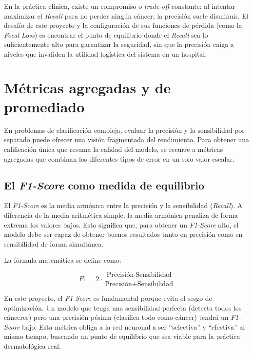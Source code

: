 En la práctica clínica, existe un compromiso o \textit{trade-off} constante: al intentar maximizar el \textit{Recall} para no perder ningún cáncer, la precisión suele disminuir. El desafío de este proyecto y la configuración de sus funciones de pérdida (como la \textit{Focal Loss}) es encontrar el punto de equilibrio donde el \textit{Recall} sea lo suficientemente alto para garantizar la seguridad, sin que la precisión caiga a niveles que invaliden la utilidad logística del sistema en un hospital.

\section{Métricas agregadas y de promediado}

En problemas de clasificación compleja, evaluar la precisión y la sensibilidad por separado puede ofrecer una visión fragmentada del rendimiento. Para obtener una calificación única que resuma la calidad del modelo, se recurre a métricas agregadas que combinan los diferentes tipos de error en un solo valor escalar.

\subsection{El \textit{F1-Score} como medida de equilibrio}

El \textit{F1-Score} es la media armónica entre la precisión y la sensibilidad (\textit{Recall}). A diferencia de la media aritmética simple, la media armónica penaliza de forma extrema los valores bajos. Esto significa que, para obtener un \textit{F1-Score} alto, el modelo debe ser capaz de obtener buenos resultados tanto en precisión como en sensibilidad de forma simultánea.

La fórmula matemática se define como:

\begin{equation}
	F1 = 2 \cdot \frac{\text{Precisión} \cdot \text{Sensibilidad}}{\text{Precisión} + \text{Sensibilidad}}
\end{equation}



En este proyecto, el \textit{F1-Score} es fundamental porque evita el sesgo de optimización. Un modelo que tenga una sensibilidad perfecta (detecta todos los cánceres) pero una precisión pésima (clasifica todo como cáncer) tendrá un \textit{F1-Score} bajo. Esta métrica obliga a la red neuronal a ser ``selectiva'' y ``efectiva'' al mismo tiempo, buscando un punto de equilibrio que sea viable para la práctica dermatológica real.

